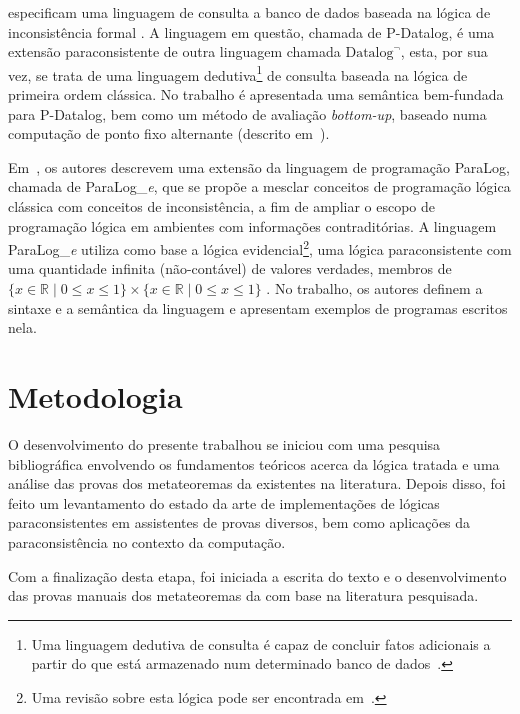         
         especificam uma linguagem de consulta a banco de dados baseada na lógica de inconsistência formal \lfium{}. A linguagem em questão, chamada de P{-}Datalog, é uma extensão paraconsistente de outra linguagem chamada $\text{Datalog}^{\neg}$, esta, por sua vez, se trata de uma linguagem dedutiva\footnote{Uma linguagem dedutiva de consulta é capaz de concluir fatos adicionais a partir do que está armazenado num determinado banco de dados~\cite{datalog}.} de consulta baseada na lógica de primeira ordem clássica. No trabalho é apresentada uma semântica bem-fundada para P{-}Datalog, bem como um método de avaliação \textit{bottom{-}up}, baseado numa computação de ponto fixo alternante (descrito em~). 
        
        Em~, os autores descrevem uma extensão da linguagem de programação ParaLog, chamada de ParaLog\_\textit{e}, que se propõe a mesclar conceitos de programação lógica clássica com conceitos de inconsistência, a fim de ampliar o escopo de programação lógica em ambientes com informações contraditórias. A linguagem ParaLog\_\textit{e} utiliza como base a lógica evidencial\footnote{Uma revisão sobre esta lógica pode ser encontrada em~.}, uma lógica paraconsistente com uma quantidade infinita (não-contável) de valores verdades, membros de $\{x \in \mathbb{R} \; | \; 0 \leq x \leq 1\} \times \{x \in \mathbb{R} \; | \; 0 \leq x \leq 1\}$ . No trabalho, os autores definem a sintaxe e a semântica da linguagem e apresentam exemplos de programas escritos nela.
    
    \section{Metodologia}\label{sec:metodologia}
      O desenvolvimento do presente trabalhou se iniciou com uma pesquisa bibliográfica envolvendo os fundamentos teóricos acerca da lógica tratada e uma análise das provas dos metateoremas da \lfium{} existentes na literatura. Depois disso, foi feito um levantamento do estado da arte de implementações de lógicas paraconsistentes em assistentes de provas diversos, bem como aplicações da paraconsistência no contexto da computação.

     Com a finalização desta etapa, foi iniciada a escrita do texto e o desenvolvimento das provas manuais dos metateoremas da \lfium{} com base na literatura pesquisada.
        

